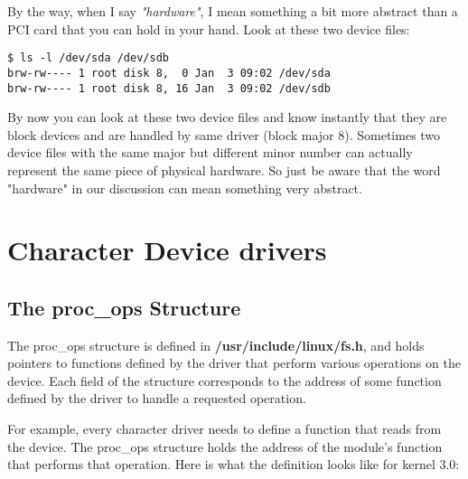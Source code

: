 \documentclass[10pt, oneside]{book}
\begin{document}
\begin{enumerate}
By the way, when I say \emph{"hardware"}, I mean something a bit more abstract than a PCI card that you can hold in your hand. Look at these two device files:

\begin{verbatim}
$ ls -l /dev/sda /dev/sdb
brw-rw---- 1 root disk 8,  0 Jan  3 09:02 /dev/sda
brw-rw---- 1 root disk 8, 16 Jan  3 09:02 /dev/sdb
\end{verbatim}

By now you can look at these two device files and know instantly that they are block devices and are handled by same driver (block major 8). Sometimes two device files with the same major but different minor number can actually represent the same piece of physical hardware. So just be aware that the word "hardware" in our discussion can mean something very abstract.
\end{enumerate}

\section{Character Device drivers}
\label{sec:orgd3ad4b9}
\subsection{The proc\_ops Structure}
\label{sec:org3950990}
The proc\_ops structure is defined in \textbf{/usr/include/linux/fs.h}, and holds pointers to functions defined by the driver that perform various operations on the device. Each field of the structure corresponds to the address of some function defined by the driver to handle a requested operation.

For example, every character driver needs to define a function that reads from the device. The proc\_ops structure holds the address of the module's function that performs that operation. Here is what the definition looks like for kernel 3.0:
\end{document}
